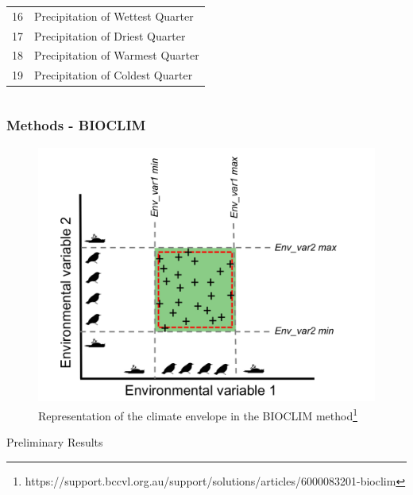 \documentclass[10pt]{beamer}
\begin{document}
\begin{frame}
\begin{columns}
\begin{column}{0.5\textwidth}
{\begin{table}
\begin{tabular}{c l}
          16       & Precipitation of Wettest Quarter       \\
          17       & Precipitation of Driest Quarter        \\
          18       & Precipitation of Warmest Quarter       \\
          19       & Precipitation of Coldest Quarter       \\
          \hline
        \end{tabular}
      \end{table}
    }
    \end{column}
  \end{columns}
\end{frame}

\begin{frame}
  \frametitle{Methods - BIOCLIM}
  \begin{figure}
    \centering
    \hspace*{-0cm}\includegraphics[scale=0.25]{fig/bioclim_bccvl.png}
    \caption{Representation of the climate envelope in the BIOCLIM method\footnote{\tiny https://support.bccvl.org.au/support/solutions/articles/6000083201-bioclim}}
  \end{figure}
\end{frame}

\begin{frame}
  \vfill
  \centering
  \huge Preliminary Results
  \vfill
\end{frame}
\end{document}
